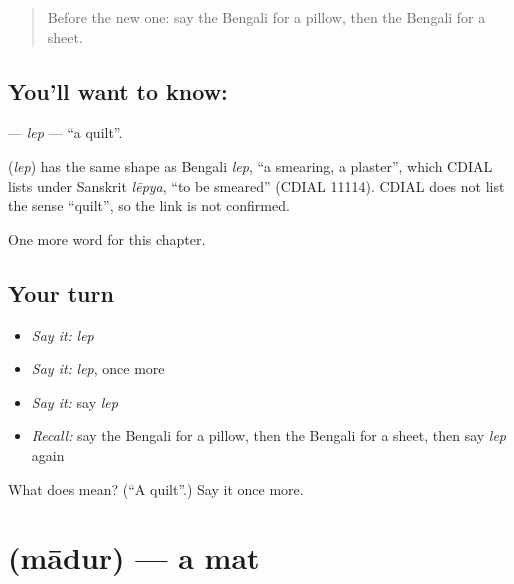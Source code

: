 \label{lesson:BN-C108-lep}



\begin{quote}
Before the new one: say the Bengali for a pillow, then the Bengali for a sheet.
\end{quote}

\subsection*{You'll want to know: }
\textbf{} — \emph{lep} — \textquotedblleft{}a quilt\textquotedblright{}.

\begin{cousinweb}
\textbf{} (\emph{lep}) has the same shape as Bengali \emph{lep}, \textquotedblleft{}a smearing, a plaster\textquotedblright{}, which CDIAL lists under Sanskrit \emph{lēpya}, \textquotedblleft{}to be smeared\textquotedblright{} (CDIAL 11114). CDIAL does not list the sense \textquotedblleft{}quilt\textquotedblright{}, so the link is not confirmed.
\end{cousinweb}

\begin{grammarlens}[title={What you've built}]
One more word for this chapter.
\end{grammarlens}

\subsection*{Your turn}
\begin{itemize}
\raggedright
  \item \emph{Say it:} \emph{lep}
  \item \emph{Say it:} \emph{lep}, once more
  \item \emph{Say it:} say \emph{lep}
  \item \emph{Recall:} say the Bengali for a pillow, then the Bengali for a sheet, then say \emph{lep} again
\end{itemize}

\begin{tcolorbox}[breakable,colback=teal!4,colframe=teal!35!black,title={Before you move on}]
What does  mean? (\textquotedblleft{}A quilt\textquotedblright{}.) Say it once more.
\end{tcolorbox}
\section[\texorpdfstring{\bn{মাদুর} (mādur)}{মাদুর (mādur)}]{ (mādur) — a mat}

